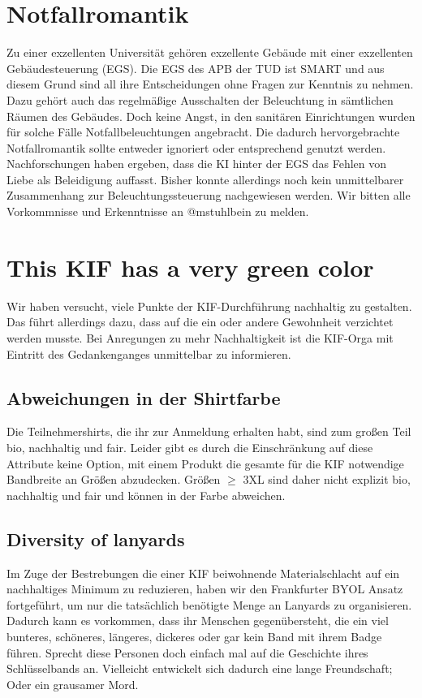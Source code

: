 \section*{Notfallromantik}
Zu einer exzellenten Universität gehören exzellente Gebäude mit einer exzellenten Gebäudesteuerung (EGS).
Die EGS des APB der TUD ist SMART und aus diesem Grund sind all ihre Entscheidungen ohne Fragen zur Kenntnis zu nehmen.
Dazu gehört auch das regelmäßige Ausschalten der Beleuchtung in sämtlichen Räumen des Gebäudes.
Doch keine Angst, in den sanitären Einrichtungen wurden für solche Fälle Notfallbeleuchtungen angebracht.
Die dadurch hervorgebrachte Notfallromantik sollte entweder ignoriert oder entsprechend genutzt werden.
Nachforschungen haben ergeben, dass die KI hinter der EGS das Fehlen von Liebe als Beleidigung auffasst.
Bisher konnte allerdings noch kein unmittelbarer Zusammenhang zur Beleuchtungssteuerung nachgewiesen werden.
Wir bitten alle Vorkommnisse und Erkenntnisse an @mstuhlbein zu melden.

\section*{This KIF has a very green color}
Wir haben versucht, viele Punkte der KIF-Durchführung nachhaltig zu gestalten.
Das führt allerdings dazu, dass auf die ein oder andere Gewohnheit verzichtet werden musste.
Bei Anregungen zu mehr Nachhaltigkeit ist die KIF-Orga mit Eintritt des Gedankenganges unmittelbar zu informieren.

\subsection*{Abweichungen in der Shirtfarbe}
Die Teilnehmershirts, die ihr zur Anmeldung erhalten habt, sind zum großen Teil bio, nachhaltig und fair.
Leider gibt es durch die Einschränkung auf diese Attribute keine Option, mit einem Produkt die gesamte für die KIF notwendige Bandbreite an Größen abzudecken.
Größen $\geq$ 3XL sind daher nicht explizit bio, nachhaltig und fair und können in der Farbe abweichen.

\subsection*{Diversity of lanyards}
Im Zuge der Bestrebungen die einer KIF beiwohnende Materialschlacht auf ein nachhaltiges Minimum zu reduzieren, haben wir den Frankfurter BYOL Ansatz fortgeführt, um nur die tatsächlich benötigte Menge an Lanyards zu organisieren.
Dadurch kann es vorkommen, dass ihr Menschen gegenübersteht, die ein viel bunteres, schöneres, längeres, dickeres oder gar kein Band mit ihrem Badge führen.
Sprecht diese Personen doch einfach mal auf die Geschichte ihres Schlüsselbands an.
Vielleicht entwickelt sich dadurch eine lange Freundschaft; Oder ein grausamer Mord.

